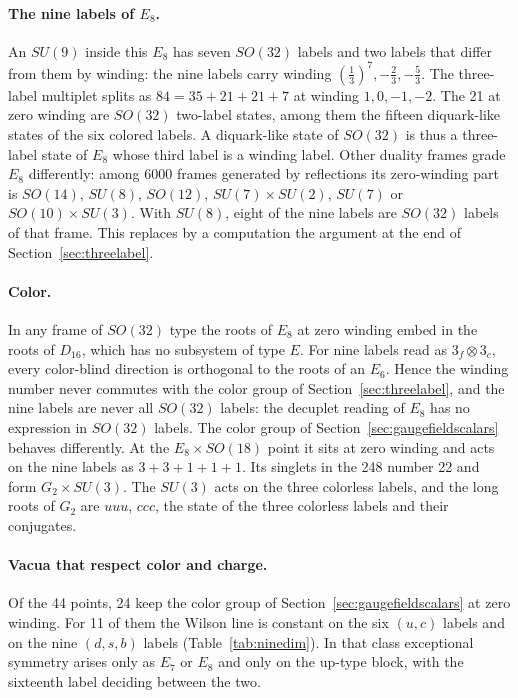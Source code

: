 \paragraph{The nine labels of $E_8$.}
An $SU(9)$ inside this $E_8$ has seven $SO(32)$ labels and two labels
that differ from them by winding: the nine labels carry winding
$(\tfrac13)^7,-\tfrac23,-\tfrac53$. The three-label multiplet splits as
$84=35+21+21+7$ at winding $1,0,-1,-2$. The 21 at zero winding are
$SO(32)$ two-label states, among them the fifteen diquark-like states of
the six colored labels. A diquark-like state of $SO(32)$ is thus a
three-label state of $E_8$ whose third label is a winding label. Other
duality frames grade $E_8$ differently: among 6000 frames generated by
reflections its zero-winding part is $SO(14)$, $SU(8)$, $SO(12)$,
$SU(7)\times SU(2)$, $SU(7)$ or $SO(10)\times SU(3)$. With $SU(8)$,
eight of the nine labels are $SO(32)$ labels of that frame. This
replaces by a computation the argument at the end of
Section~\ref{sec:threelabel}.

\paragraph{Color.}
In any frame of $SO(32)$ type the roots of $E_8$ at zero winding embed
in the roots of $D_{16}$, which has no subsystem of type $E$. For nine
labels read as $3_f\otimes3_c$, every color-blind direction is orthogonal
to the roots of an $E_6$. Hence the winding number never commutes with
the color group of Section~\ref{sec:threelabel}, and the nine labels
are never all $SO(32)$ labels: the decuplet reading of $E_8$ has no
expression in $SO(32)$ labels. The color group of
Section~\ref{sec:gaugefieldscalars} behaves differently. At the
$E_8\times SO(18)$ point it sits at zero winding and acts on the nine
labels as $3+3+1+1+1$. Its singlets in the 248 number 22 and form
$G_2\times SU(3)$. The $SU(3)$ acts on the three colorless labels, and
the long roots of $G_2$ are $uuu$, $ccc$, the state of the three
colorless labels and their conjugates.

\paragraph{Vacua that respect color and charge.}
Of the 44 points, 24 keep the color group of
Section~\ref{sec:gaugefieldscalars} at zero winding. For 11 of them the
Wilson line is constant on the six $(u,c)$ labels and on the nine
$(d,s,b)$ labels (Table~\ref{tab:ninedim}). In that class exceptional
symmetry arises only as $E_7$ or $E_8$ and only on the up-type block,
with the sixteenth label deciding between the two.

